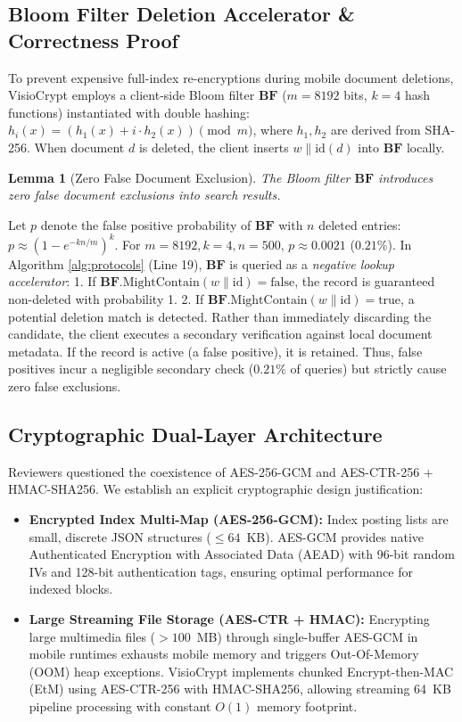 \documentclass[10pt,conference]{IEEEtran}
\newenvironment{revised}{\color{revcolor}}{}
\newtheorem{lemma}{Lemma}
\begin{document}
\begin{revised}
\subsection{Bloom Filter Deletion Accelerator \& Correctness Proof}
To prevent expensive full-index re-encryptions during mobile document deletions, VisioCrypt employs a client-side Bloom filter $\mathbf{BF}$ ($m = 8192$ bits, $k = 4$ hash functions) instantiated with double hashing: $h_i(x) = (h_1(x) + i \cdot h_2(x)) \pmod m$, where $h_1, h_2$ are derived from SHA-256. When document $d$ is deleted, the client inserts $w \parallel \text{id}(d)$ into $\mathbf{BF}$ locally.

\begin{lemma}[Zero False Document Exclusion]
The Bloom filter $\mathbf{BF}$ introduces zero false document exclusions into search results.
\end{lemma}
\begin{IEEEproof}
Let $p$ denote the false positive probability of $\mathbf{BF}$ with $n$ deleted entries: $p \approx (1 - e^{-k n / m})^k$. For $m = 8192, k = 4, n = 500$, $p \approx 0.0021$ ($0.21\%$). In Algorithm \ref{alg:protocols} (Line 19), $\mathbf{BF}$ is queried as a \emph{negative lookup accelerator}:
1. If $\mathbf{BF}.\text{MightContain}(w \parallel \text{id}) = \text{false}$, the record is guaranteed non-deleted with probability 1.
2. If $\mathbf{BF}.\text{MightContain}(w \parallel \text{id}) = \text{true}$, a potential deletion match is detected. Rather than immediately discarding the candidate, the client executes a secondary verification against local document metadata. If the record is active (a false positive), it is retained. Thus, false positives incur a negligible secondary check ($0.21\%$ of queries) but strictly cause zero false exclusions.
\end{IEEEproof}

\subsection{Cryptographic Dual-Layer Architecture}
Reviewers questioned the coexistence of AES-256-GCM and AES-CTR-256 + HMAC-SHA256. We establish an explicit cryptographic design justification:
\begin{itemize}
    \item \textbf{Encrypted Index Multi-Map (AES-256-GCM):} Index posting lists are small, discrete JSON structures ($\le 64$~KB). AES-GCM provides native Authenticated Encryption with Associated Data (AEAD) with 96-bit random IVs and 128-bit authentication tags, ensuring optimal performance for indexed blocks.
    \item \textbf{Large Streaming File Storage (AES-CTR + HMAC):} Encrypting large multimedia files ($> 100$~MB) through single-buffer AES-GCM in mobile runtimes exhausts mobile memory and triggers Out-Of-Memory (OOM) heap exceptions. VisioCrypt implements chunked Encrypt-then-MAC (EtM) using AES-CTR-256 with HMAC-SHA256, allowing streaming 64~KB pipeline processing with constant $O(1)$ memory footprint.
\end{itemize}


\end{revised}
\end{document}
